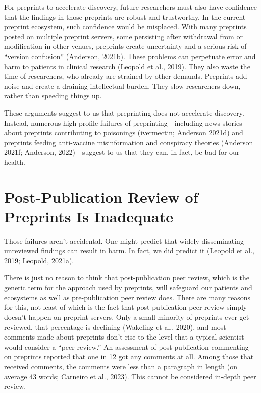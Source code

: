 \documentclass[authordate, perspective, issue]{jote-new-article}
\begin{document}
	For preprints to accelerate discovery, future researchers must also have confidence that the findings in those preprints are robust and trustworthy. In the current preprint ecosystem, such confidence would be misplaced. With many preprints posted on multiple preprint servers, some persisting after withdrawal from or modification in other venues, preprints create uncertainty and a serious risk of “version confusion” (Anderson, 2021b). These problems can perpetuate error and harm to patients in clinical research (Leopold et al., 2019). They also waste the time of researchers, who already are strained by other demands. Preprints add noise and create a draining intellectual burden. They slow researchers down, rather than speeding things up.







	These arguments suggest to us that preprinting does not accelerate discovery. Instead, numerous high-profile failures of preprinting—including news stories about preprints contributing to poisonings (ivermectin; Anderson 2021d) and preprints feeding anti-vaccine misinformation and conspiracy theories (Anderson 2021f; Anderson,\textbf{ }2022)—suggest to us that they can, in fact, be bad for our health.







	\section{Post-Publication Review of Preprints Is Inadequate}







	Those failures aren't accidental. One might predict that widely disseminating unreviewed findings can result in harm. In fact, we did predict it (Leopold et al., 2019; Leopold, 2021a).







	There is just no reason to think that post-publication peer review, which is the generic term for the approach used by preprints, will safeguard our patients and ecosystems as well as pre-publication peer review does. There are many reasons for this, not least of which is the fact that post-publication peer review simply doesn't happen on preprint servers. Only a small minority of preprints ever get reviewed, that percentage is declining (Wakeling et al., 2020), and most comments made about preprints don't rise to the level that a typical scientist would consider a “peer review.” An assessment of post-publication commenting on preprints reported that one in 12 got any comments at all. Among those that received comments, the comments were less than a paragraph in length (on average 43 words; Carneiro et al., 2023). This cannot be considered in-depth peer review.
\end{document}
